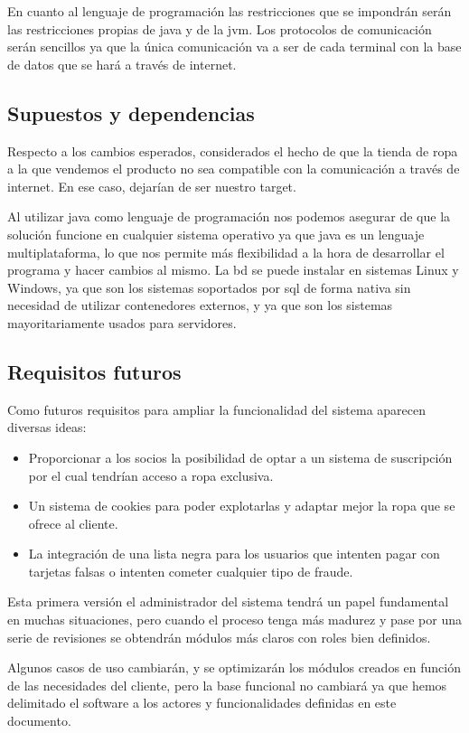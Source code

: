 En cuanto al lenguaje de programación las restricciones que se impondrán serán las restricciones propias de java y de la \gls{jvm}.
Los protocolos de comunicación serán sencillos ya que la única comunicación va a ser
de cada terminal con la base de datos que se hará a través de internet.



\subsection{Supuestos y dependencias}
Respecto a los cambios esperados, considerados el hecho de que la tienda de ropa a
la que vendemos el producto no sea compatible con la comunicación a través de
internet. En ese caso, dejarían de ser nuestro target.

Al utilizar java como lenguaje de programación nos podemos asegurar de que la solución funcione en cualquier sistema operativo ya que java es un lenguaje multiplataforma, lo que nos permite más flexibilidad a la hora de desarrollar el programa y hacer cambios al mismo. La \gls{bd} se puede instalar en sistemas Linux y Windows, ya que son los sistemas soportados por \gls{sql} de forma nativa sin necesidad de utilizar contenedores externos, y ya que son los sistemas mayoritariamente usados para servidores.

\subsection{Requisitos futuros}
Como futuros requisitos para ampliar la funcionalidad del sistema aparecen diversas ideas:
\begin{itemize}
    \item Proporcionar a los socios la posibilidad de optar a un sistema de suscripción por el cual tendrían acceso a ropa exclusiva.
    \item Un sistema de cookies para poder explotarlas y adaptar mejor la ropa que se ofrece al cliente.
    \item La integración de una lista negra para los usuarios que intenten pagar con tarjetas falsas o intenten cometer cualquier tipo de fraude.
\end{itemize}

Esta primera versión el administrador del sistema tendrá un papel fundamental en
muchas situaciones, pero cuando el proceso tenga más madurez y pase por una serie
de revisiones se obtendrán módulos más claros con roles bien definidos.

Algunos casos de uso cambiarán, y se optimizarán los módulos creados en función de
las necesidades del cliente, pero la base funcional no cambiará ya que hemos
delimitado el software a los actores y funcionalidades definidas en este documento.

